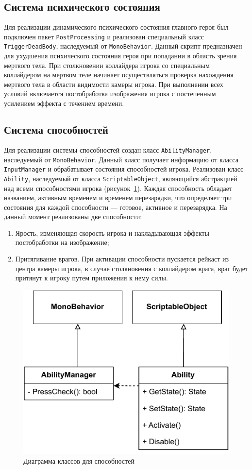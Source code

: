 \subsection{Система психического состояния}
Для реализации динамического психического состояния главного героя был подключен пакет \texttt{PostProcessing} и реализован специальный класс \texttt{TriggerDeadBody}, наследуемый от \texttt{MonoBehavior}. Данный скрипт предназначен для ухудшения психического состояния героя при попадании в область зрения мертвого тела. При столкновении коллайдера игрока со специальным коллайдером на мертвом теле начинает осуществляться проверка нахождения мертвого тела в области видимости камеры игрока. При выполнении всех условий включается постобработка изображения игрока с постепенным усилением эффекта с течением времени.

\subsection{Система способностей}
Для реализации системы способностей создан класс \texttt{AbilityManager}, наследуемый от \texttt{MonoBehavior}. Данный класс получает информацию от класса \texttt{InputManager} и обрабатывает состояния способностей игрока. Реализован класс \texttt{Ability}, наследуемый от класса \texttt{ScriptableObject}, являющийся абстракцией над всеми способностями игрока (рисунок~\ref{fig:Ability}). Каждая способность обладает названием, активным временем и временем перезарядки, что определяет три состояния для каждой способности --- готовое, активное и перезарядка. На данный момент реализованы две способности:
\begin{enumerate}
\item  Ярость, изменяющая скорость игрока и накладывающая эффекты постобработки на изображение;
\item  Притягивание врагов. При активации способности пускается рейкаст из центра камеры игрока, в случае столкновения с коллайдером врага, враг будет притянут к игроку путем приложения к нему силы.
\end{enumerate}

\begin{figure}[H]
    \centering
    \includegraphics[width=\textwidth]{figures/Ability.pdf}
    \caption{Диаграмма классов для способностей}
    \label{fig:Ability}
\end{figure}
